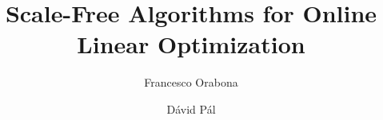 \documentclass{elsarticle}
\begin{document}
\begin{frontmatter}

\title{Scale-Free Algorithms for Online Linear Optimization}

\author{Francesco Orabona}

\author{D\'avid P\'al}

\address{Yahoo Labs, 11th Floor, 229 West 43rd Street, New York, NY 10036, USA}

\begin{abstract}

\end{abstract}

\end{frontmatter}









{\small


}

\appendix






\end{document}
